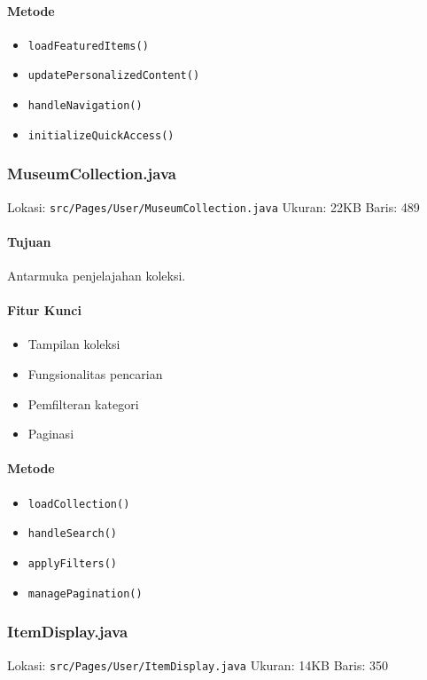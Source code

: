 \documentclass[12pt,a4paper]{article}
\begin{document}
\paragraph{Metode}
\begin{itemize}
    \item \texttt{loadFeaturedItems()}
    \item \texttt{updatePersonalizedContent()}
    \item \texttt{handleNavigation()}
    \item \texttt{initializeQuickAccess()}
\end{itemize}

\subsubsection{MuseumCollection.java}
Lokasi: \texttt{src/Pages/User/MuseumCollection.java}
Ukuran: 22KB
Baris: 489

\paragraph{Tujuan}
Antarmuka penjelajahan koleksi.

\paragraph{Fitur Kunci}
\begin{itemize}
    \item Tampilan koleksi
    \item Fungsionalitas pencarian
    \item Pemfilteran kategori
    \item Paginasi
\end{itemize}

\paragraph{Metode}
\begin{itemize}
    \item \texttt{loadCollection()}
    \item \texttt{handleSearch()}
    \item \texttt{applyFilters()}
    \item \texttt{managePagination()}
\end{itemize}

\subsubsection{ItemDisplay.java}
Lokasi: \texttt{src/Pages/User/ItemDisplay.java}
Ukuran: 14KB
Baris: 350
\end{document}
